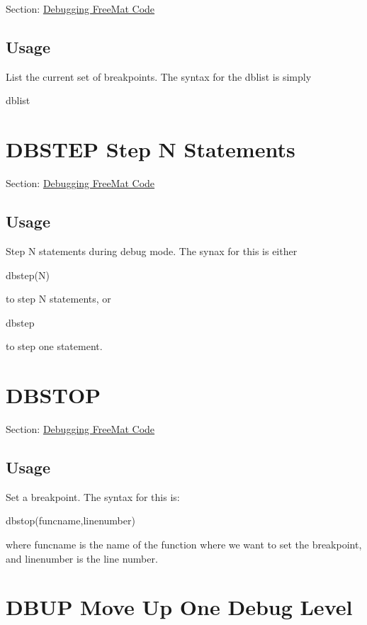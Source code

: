 Section\-: \hyperlink{sec_debug}{Debugging Free\-Mat Code} \hypertarget{vtkwidgets_vtkxyplotwidget_Usage}{}\subsection{Usage}\label{vtkwidgets_vtkxyplotwidget_Usage}
List the current set of breakpoints. The syntax for the {\ttfamily dblist} is simply \begin{DoxyVerb}  dblist
\end{DoxyVerb}
 \hypertarget{debug_dbstep}{}\section{D\-B\-S\-T\-E\-P Step N Statements}\label{debug_dbstep}
Section\-: \hyperlink{sec_debug}{Debugging Free\-Mat Code} \hypertarget{vtkwidgets_vtkxyplotwidget_Usage}{}\subsection{Usage}\label{vtkwidgets_vtkxyplotwidget_Usage}
Step {\ttfamily N} statements during debug mode. The synax for this is either \begin{DoxyVerb}  dbstep(N)
\end{DoxyVerb}
 to step {\ttfamily N} statements, or \begin{DoxyVerb}  dbstep
\end{DoxyVerb}
 to step one statement. \hypertarget{debug_dbstop}{}\section{D\-B\-S\-T\-O\-P}\label{debug_dbstop}
Section\-: \hyperlink{sec_debug}{Debugging Free\-Mat Code} \hypertarget{vtkwidgets_vtkxyplotwidget_Usage}{}\subsection{Usage}\label{vtkwidgets_vtkxyplotwidget_Usage}
Set a breakpoint. The syntax for this is\-: \begin{DoxyVerb}  dbstop(funcname,linenumber)
\end{DoxyVerb}
 where {\ttfamily funcname} is the name of the function where we want to set the breakpoint, and {\ttfamily linenumber} is the line number. \hypertarget{debug_dbup}{}\section{D\-B\-U\-P Move Up One Debug Level}\label{debug_dbup}
